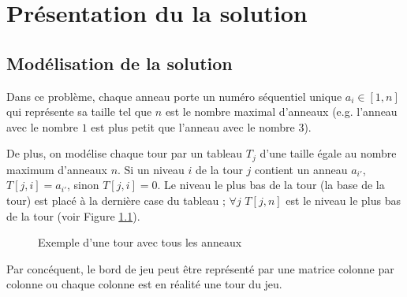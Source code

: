 \chapter{Présentation du la solution}

\section{Modélisation de la solution}
Dans ce problème, chaque anneau porte un numéro séquentiel unique $a_i \in [1, n]$ qui représente sa taille tel que $n$ est le nombre maximal d'anneaux (e.g. l'anneau avec le nombre $1$ est plus petit que l'anneau avec le nombre $3$).
\par
De plus, on modélise chaque tour par un tableau $T_j$ d'une taille égale au nombre maximum d'anneaux $n$. Si un niveau $i$ de la tour $j$ contient un anneau $a_{i'}$, $T[j, i] = a_{i'}$, sinon $T[j, i] = 0$. Le niveau le plus bas de la tour (la base de la tour) est placé à la dernière case du tableau ; $\forall j$ $T[j, n]$ est le niveau le plus bas de la tour (voir Figure \ref{fig:rep_tour}).

\begin{figure}[h!]
    \begin{center}
        \caption{Exemple d'une tour avec tous les anneaux}
        \label{fig:rep_tour}
    \end{center}
\end{figure}

\par
Par concéquent, le bord de jeu peut être représenté par une matrice colonne par colonne ou chaque colonne est en réalité une tour du jeu.

